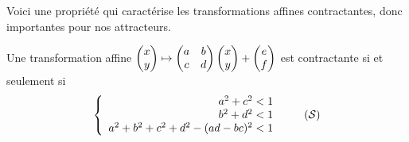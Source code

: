 \documentclass[11pt,class=report,crop=false]{standalone}
\begin{document}
 
Voici une propriété qui caractérise les transformations affines contractantes,
donc importantes pour nos attracteurs.

\begin{proposition}
Une transformation affine 
$\begin{pmatrix}x \\ y\end{pmatrix} \mapsto \begin{pmatrix}a & b \\ c & d \\  \end{pmatrix}
\begin{pmatrix}x \\ y\end{pmatrix} + \begin{pmatrix}e \\ f\end{pmatrix}$
est contractante si et seulement si
\begin{equation}
\left \{
\begin{array}{r}
    a^2 + c^2 < 1 \\
    b^2 + d^2 < 1 \\
    a^2+b^2+c^2+d^2 - (ad-bc)^2 < 1 \\
\end{array}
\right.
\label{eq:syscontrac}\tag{$\mathcal{S}$}
\end{equation}
\end{proposition}
\end{document}
